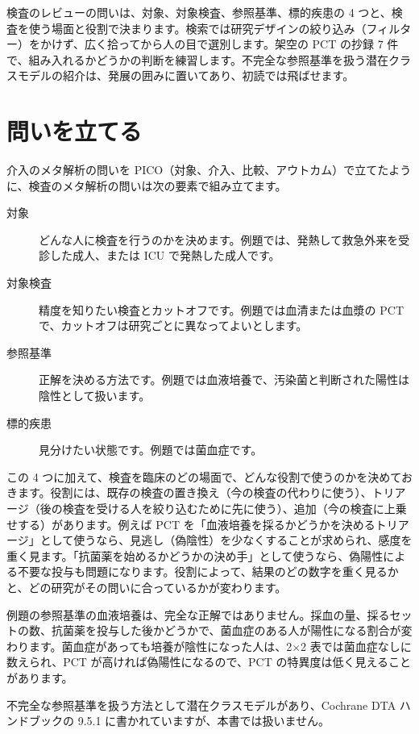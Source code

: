 \begin{chapintro}
検査のレビューの問いは、対象、対象検査、参照基準、標的疾患の 4 つと、検査を使う場面と役割で決まります。検索では研究デザインの絞り込み（フィルター）をかけず、広く拾ってから人の目で選別します。架空の PCT の抄録 7 件で、組み入れるかどうかの判断を練習します。不完全な参照基準を扱う潜在クラスモデルの紹介は、発展の囲みに置いてあり、初読では飛ばせます。
\end{chapintro}

\section{問いを立てる}
\label{sec:11-1}

介入のメタ解析の問いを PICO（対象、介入、比較、アウトカム）で立てたように、検査のメタ解析の問いは次の要素で組み立てます。
\begin{description}
\item[対象] どんな人に検査を行うのかを決めます。例題では、発熱して救急外来を受診した成人、または ICU で発熱した成人です。
\item[対象検査] 精度を知りたい検査とカットオフです。例題では血清または血漿の PCT で、カットオフは研究ごとに異なってよいとします。
\item[参照基準] 正解を決める方法です。例題では血液培養で、汚染菌と判断された陽性は陰性として扱います。
\item[標的疾患] 見分けたい状態です。例題では菌血症です。
\end{description}

この 4 つに加えて、検査を臨床のどの場面で、どんな役割で使うのかを決めておきます。役割には、既存の検査の置き換え（今の検査の代わりに使う）、トリアージ（後の検査を受ける人を絞り込むために先に使う）、追加（今の検査に上乗せする）があります。例えば PCT を「血液培養を採るかどうかを決めるトリアージ」として使うなら、見逃し（偽陰性）を少なくすることが求められ、感度を重く見ます。「抗菌薬を始めるかどうかの決め手」として使うなら、偽陽性による不要な投与も問題になります。役割によって、結果のどの数字を重く見るかと、どの研究がその問いに合っているかが変わります。

例題の参照基準の血液培養は、完全な正解ではありません。採血の量、採るセットの数、抗菌薬を投与した後かどうかで、菌血症のある人が陽性になる割合が変わります。菌血症があっても培養が陰性になった人は、2×2 表では菌血症なしに数えられ、PCT が高ければ偽陽性になるので、PCT の特異度は低く見えることがあります。

\begin{hattenbox}
不完全な参照基準を扱う方法として潜在クラスモデルがあり、Cochrane DTA ハンドブックの 9.5.1 に書かれていますが、本書では扱いません。
\end{hattenbox}

